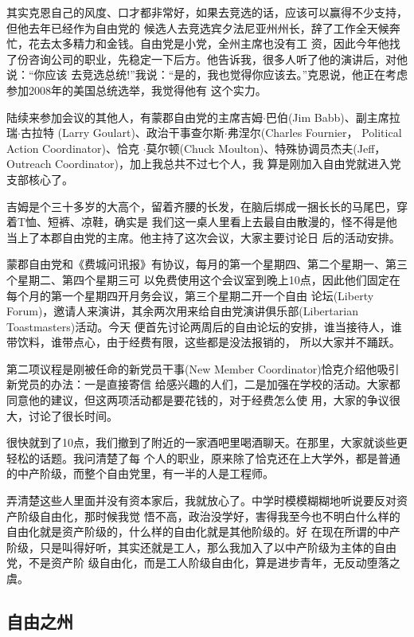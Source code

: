 ﻿\documentclass[11pt]{article}
\begin{document}
其实克恩自己的风度、口才都非常好，如果去竞选的话，应该可以赢得不少支持，但他去年已经作为自由党的
候选人去竞选宾夕法尼亚州州长，辞了工作全天候奔忙，花去太多精力和金钱。自由党是小党，全州主席也没有工
资，因此今年他找了份咨询公司的职业，先稳定一下后方。他告诉我，很多人听了他的演讲后，对他说：``你应该
去竞选总统!''我说：``是的，我也觉得你应该去。''克恩说，他正在考虑参加2008年的美国总统选举，我觉得他有
这个实力。

陆续来参加会议的其他人，有蒙郡自由党的主席吉姆$\cdot$巴伯(Jim Babb)、副主席拉瑞$\cdot$古拉特
(Larry Goulart)、政治干事查尔斯$\cdot$弗涅尔(Charles Fournier， Political Action Coordinator)、恰克
$\cdot$莫尔顿(Chuck Moulton)、特殊协调员杰夫(Jeff， Outreach Coordinator)，加上我总共不过七个人，我
算是刚加入自由党就进入党支部核心了。

吉姆是个三十多岁的大高个，留着齐腰的长发，在脑后绑成一捆长长的马尾巴，穿着T恤、短裤、凉鞋，确实是
我们这一桌人里看上去最自由散漫的，怪不得是他当上了本郡自由党的主席。他主持了这次会议，大家主要讨论日
后的活动安排。

蒙郡自由党和《费城问讯报》有协议，每月的第一个星期四、第二个星期一、第三个星期二、第四个星期三可
以免费使用这个会议室到晚上10点，因此他们固定在每个月的第一个星期四开月务会议，第三个星期二开一个自由
论坛(Liberty Forum)，邀请人来演讲，其余两次用来给自由党演讲俱乐部(Libertarian Toastmasters)活动。今天
便首先讨论两周后的自由论坛的安排，谁当接待人，谁带饮料，谁带点心，由于经费有限，这些都是没法报销的，
所以大家并不踊跃。

第二项议程是刚被任命的新党员干事(New Member Coordinator)恰克介绍他吸引新党员的办法：一是直接寄信
给感兴趣的人们，二是加强在学校的活动。大家都同意他的建议，但这两项活动都是要花钱的，对于经费怎么使
用，大家的争议很大，讨论了很长时间。

很快就到了10点，我们撤到了附近的一家酒吧里喝酒聊天。在那里，大家就谈些更轻松的话题。我问清楚了每
个人的职业，原来除了恰克还在上大学外，都是普通的中产阶级，而整个自由党里，有一半的人是工程师。

弄清楚这些人里面并没有资本家后，我就放心了。中学时模模糊糊地听说要反对资产阶级自由化，那时候我觉
悟不高，政治没学好，害得我至今也不明白什么样的自由化就是资产阶级的，什么样的自由化就是其他阶级的。好
在现在所谓的中产阶级，只是叫得好听，其实还就是工人，那么我加入了以中产阶级为主体的自由党，不是资产阶
级自由化，而是工人阶级自由化，算是进步青年，无反动堕落之虞。

\subsection{自由之州}
\end{document}
